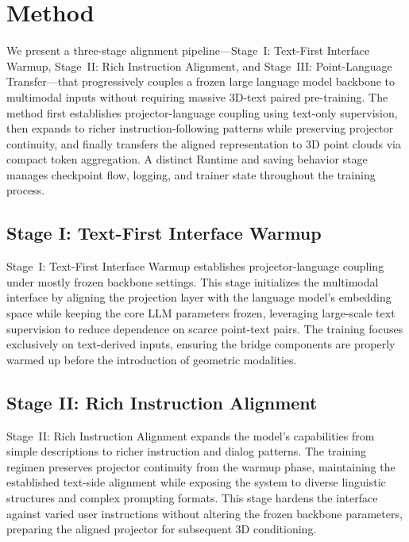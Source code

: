 \section{Method}

We present a three-stage alignment pipeline---Stage~I: Text-First Interface Warmup, Stage~II: Rich Instruction Alignment, and Stage~III: Point-Language Transfer---that progressively couples a frozen large language model backbone to multimodal inputs without requiring massive 3D-text paired pre-training. The method first establishes projector-language coupling using text-only supervision, then expands to richer instruction-following patterns while preserving projector continuity, and finally transfers the aligned representation to 3D point clouds via compact token aggregation. A distinct Runtime and saving behavior stage manages checkpoint flow, logging, and trainer state throughout the training process.

\subsection{Stage I: Text-First Interface Warmup}

Stage~I: Text-First Interface Warmup establishes projector-language coupling under mostly frozen backbone settings. This stage initializes the multimodal interface by aligning the projection layer with the language model's embedding space while keeping the core LLM parameters frozen, leveraging large-scale text supervision to reduce dependence on scarce point-text pairs. The training focuses exclusively on text-derived inputs, ensuring the bridge components are properly warmed up before the introduction of geometric modalities.

\subsection{Stage II: Rich Instruction Alignment}

Stage~II: Rich Instruction Alignment expands the model's capabilities from simple descriptions to richer instruction and dialog patterns. The training regimen preserves projector continuity from the warmup phase, maintaining the established text-side alignment while exposing the system to diverse linguistic structures and complex prompting formats. This stage hardens the interface against varied user instructions without altering the frozen backbone parameters, preparing the aligned projector for subsequent 3D conditioning.

